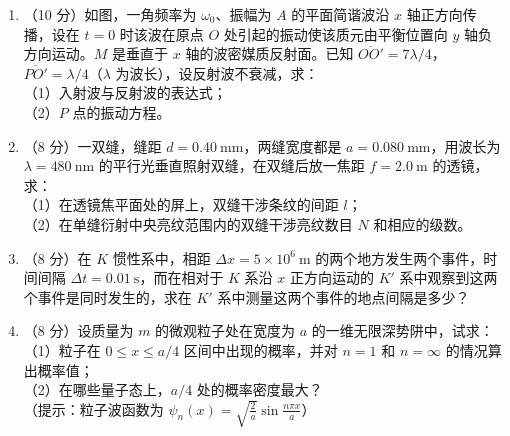 \documentclass[zihao=5,a4paper,UTF8]{ctexart}
\begin{document}
\begin{enumerate}[leftmargin=2em, itemsep=8pt, start=20]
    \item \begin{minipage}[t]{0.70\textwidth}
    （10 分）如图，一角频率为 $\omega_0$、振幅为 $A$ 的平面简谐波沿 $x$ 轴正方向传播，设在 $t=0$ 时该波在原点 $O$ 处引起的振动使该质元由平衡位置向 $y$ 轴负方向运动。$M$ 是垂直于 $x$ 轴的波密媒质反射面。已知 $\overline{OO'} = 7\lambda/4$，$\overline{PO'} = \lambda/4$（$\lambda$ 为波长），设反射波不衰减，求：\\
    （1）入射波与反射波的表达式；\\
    （2）$P$ 点的振动方程。
    \end{minipage}%
    \begin{minipage}[t]{0.28\textwidth}
    \centering
    \end{minipage}

    \item （8 分）一双缝，缝距 $d=0.40\ \mathrm{mm}$，两缝宽度都是 $a=0.080\ \mathrm{mm}$，用波长为 $\lambda=480\ \mathrm{nm}$ 的平行光垂直照射双缝，在双缝后放一焦距 $f=2.0\ \mathrm{m}$ 的透镜，求：\\
    （1）在透镜焦平面处的屏上，双缝干涉条纹的间距 $l$；\\
    （2）在单缝衍射中央亮纹范围内的双缝干涉亮纹数目 $N$ 和相应的级数。

    \item （8 分）在 $K$ 惯性系中，相距 $\Delta x = 5\times 10^6\ \mathrm{m}$ 的两个地方发生两个事件，时间间隔 $\Delta t = 0.01\ \mathrm{s}$，而在相对于 $K$ 系沿 $x$ 正方向运动的 $K'$ 系中观察到这两个事件是同时发生的，求在 $K'$ 系中测量这两个事件的地点间隔是多少？

    \item （8 分）设质量为 $m$ 的微观粒子处在宽度为 $a$ 的一维无限深势阱中，试求：\\
    （1）粒子在 $0 \le x \le a/4$ 区间中出现的概率，并对 $n=1$ 和 $n=\infty$ 的情况算出概率值；\\
    （2）在哪些量子态上，$a/4$ 处的概率密度最大？\\
    （提示：粒子波函数为 $\psi_n(x) = \sqrt{\frac{2}{a}}\sin\frac{n\pi x}{a}$）
\end{enumerate}
\end{document}

